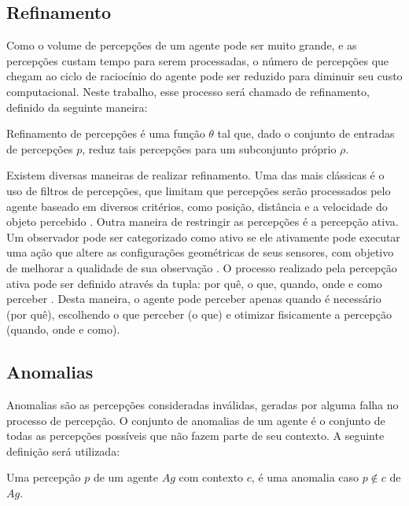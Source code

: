 \subsection{Refinamento}

Como o volume de percepções de um agente pode ser muito grande, e as percepções custam tempo para serem processadas, o número de percepções que chegam ao ciclo de raciocínio do agente pode ser reduzido para diminuir seu custo computacional. Neste trabalho, esse processo será chamado de refinamento, definido da seguinte maneira:

\begin{definition}
    \label{def:refinamento}
    Refinamento de percepções é uma função $\theta$ tal que, dado o conjunto de entradas de percepções $p$, reduz tais percepções para um subconjunto próprio $\rho$.
\end{definition}

Existem diversas maneiras de realizar refinamento. Uma das mais clássicas é o uso de filtros de percepções, que limitam que percepções serão processados pelo agente baseado em diversos critérios, como posição, distância e a velocidade do objeto percebido \cite{bordeux2001}. Outra maneira de restringir as percepções é a percepção ativa. Um observador pode ser categorizado como ativo se ele ativamente pode executar uma ação que altere as configurações geométricas de seus sensores, com objetivo de melhorar a qualidade de sua observação \cite{Aloimonos1988}. O processo realizado pela percepção ativa pode ser definido através da tupla: por quê, o que, quando, onde e como perceber  \cite{Bajcsy2018}. Desta maneira, o agente pode perceber apenas quando é necessário (por quê), escolhendo o que perceber (o que) e otimizar fisicamente a percepção (quando, onde e como).

\subsection{Anomalias}

Anomalias são as percepções consideradas inválidas, geradas por alguma falha no processo de percepção. O conjunto de anomalias de um agente é o conjunto de todas as percepções possíveis que não fazem parte de seu contexto. A seguinte definição será utilizada:

\begin{definition}
    Uma percepção $p$ de um agente $Ag$ com contexto $c$, é uma anomalia caso $p \notin c$ de $Ag$.
\end{definition}

